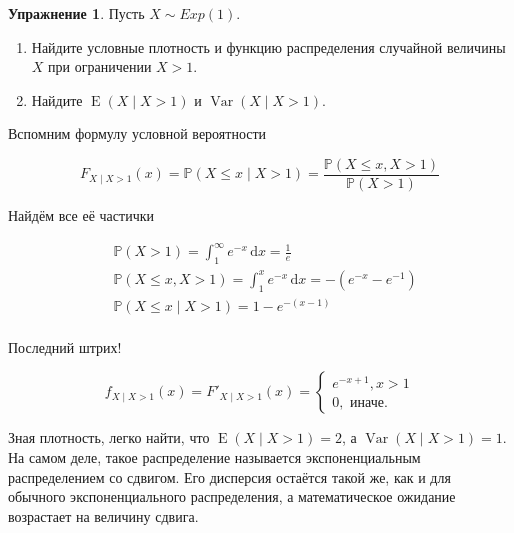 \documentclass[12pt, a4paper, oneside]{extreport}
\DeclareMathOperator{\Var}{Var}
\DeclareMathOperator{\E}{\mathop{E}}
\def \mbb{\mathbb}
\def \PP{\mbb{P}}
\newcommand{\dx}[1]{\,\mathrm{d}#1} %
\theoremstyle{plain}              %
\theoremstyle{definition}         %
\newtheorem{problem}{\color{myblue} Упражнение}
\begin{document}
\begin{problem} 
Пусть $X \sim Exp(1)$. 

\begin{enumerate} 
\item  Найдите условные плотность и функцию распределения случайной величины $X$ при ограничении $X > 1$.
\item  Найдите $\E(X \mid X > 1)$ и  $\Var(X \mid X > 1)$.
\end{enumerate} 
\begin{sol}
	Вспомним формулу условной вероятности
	
	\[ F_{X \mid X > 1} (x) = \PP(X \le x \mid X > 1) = \frac{\PP(X \le x, X > 1)}{\PP(X > 1)}\]
	
Найдём все её частички

\begin{equation*}
\begin{aligned}
& \PP(X > 1) = \int_1^{\infty} e^{-x} \dx{x} = \frac{1}{e} \\ 
& \PP(X \le x, X >1) = \int_1^x e^{-x} \dx{x} = -(e^{-x} - e^{-1}) \\
& \PP(X \le x \mid X > 1) = 1 - e^{-(x - 1)} \\
\end{aligned}
\end{equation*}

Последний штрих! 

\[ f_{X \mid X > 1} (x) =  F'_{X \mid X > 1} (x) = \begin{cases} e^{-x + 1}, x > 1 \\ 0, \text{  иначе.} \end{cases} \]

Зная плотность, легко найти, что $\E(X \mid X >1) = 2$, а $\Var(X \mid X > 1) = 1$.  На самом деле, такое распределение называется экспоненциальным распределением со сдвигом. Его дисперсия остаётся такой же, как и для обычного экспоненциального распределения, а математическое ожидание возрастает на величину сдвига. 
\end{sol} 
\end{problem}
\end{document}
